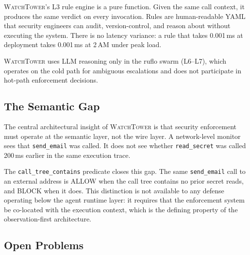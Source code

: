 \documentclass[conference]{IEEEtran}
\begin{document}
\textsc{WatchTower}'s L3 rule engine is a pure function. Given the same
call context, it produces the same verdict on every invocation. Rules are
human-readable YAML that security engineers can audit, version-control,
and reason about without executing the system. There is no latency
variance: a rule that takes 0.001\,ms at deployment takes 0.001\,ms at
2\,AM under peak load.

\textsc{WatchTower} uses LLM reasoning only in the ruflo swarm (L6--L7),
which operates on the cold path for ambiguous escalations and does not
participate in hot-path enforcement decisions.

\subsection{The Semantic Gap}

The central architectural insight of \textsc{WatchTower} is that security
enforcement must operate at the semantic layer, not the wire layer. A
network-level monitor sees that \texttt{send\_email} was called. It does
not see whether \texttt{read\_secret} was called 200\,ms earlier in the
same execution trace.

The \texttt{call\_tree\_contains} predicate closes this gap. The same
\texttt{send\_email} call to an external address is ALLOW when the call
tree contains no prior secret reads, and BLOCK when it does. This
distinction is not available to any defense operating below the agent
runtime layer: it requires that the enforcement system be co-located with
the execution context, which is the defining property of the
observation-first architecture.

\subsection{Open Problems}
\end{document}
